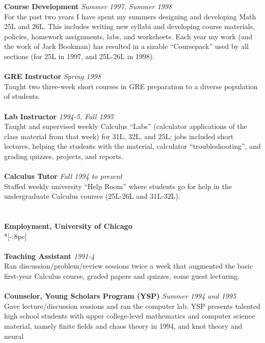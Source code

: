 {\bf Course Development} \hfill {\it Summer 1997, Summer 1998\/} \\
For the past two years I have spent my summers designing and developing
Math 25L and 26L.  This includes writing new syllabi and developing
course materials, policies, homework assignments, labs, and worksheets.
Each year my work (and the work of Jack Bookman)
has resulted in a sizable ``Coursepack'' used by all sections 
(for 25L in 1997, and 25L-26L in 1998). \\
\\
{\bf GRE Instructor} \hfill {\it Spring 1998\/} \\
Taught two three-week short courses in GRE preparation to a diverse
population of students. \\
\\
{\bf Lab Instructor} \hfill {\it 1994-5, Fall 1995\/} \\
Taught and supervised weekly Calculus ``Labs'' (calculator applications 
of the class material from that week) for 31L, 32L, and 25L; jobs included 
short lectures, helping the students with the material,
calculator ``troubleshooting'', and grading quizzes, 
projects, and reports. \\
\\
{\bf Calculus Tutor} \hfill {\it Fall 1994 to present\/} \\
Staffed weekly university ``Help Room'' where students go for help
in the undergraduate Calculus courses (25L-26L and 31L-32L). \\
\\
\\
{\large \bf Employment, University of Chicago} \\*[-.8pc]
\underline{\hspace{6in}} \\
\\
{\bf Teaching Assistant} \hfill {\it 1991-4\/} \\
Ran discussion/problem/review sessions twice a week that augmented the 
basic first-year Calculus course, graded papers and quizzes, some guest 
lecturing. \\
\\
{\bf Counselor, Young Scholars Program (YSP)} \hfill {\it Summer 1994 and 1995\/} \\
Gave lecture/discussion sessions and ran the computer lab. 
YSP presents talented high school students
with upper college-level mathematics and computer science material, 
namely finite fields and chaos theory in 1994, and knot theory and neural 
